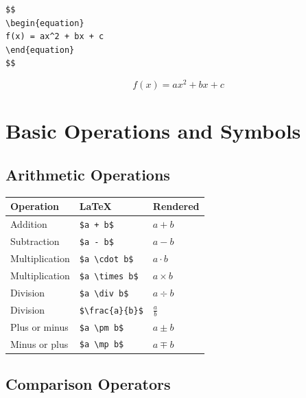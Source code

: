 \documentclass[
  letterpaper,
  DIV=11,
  numbers=noendperiod]{scrartcl}
\begin{document}
\begin{verbatim}
$$
\begin{equation}
f(x) = ax^2 + bx + c
\end{equation}
$$
\end{verbatim}

\[
\begin{equation}
f(x) = ax^2 + bx + c
\end{equation}
\]

\hypertarget{basic-operations-and-symbols}{%
\section{Basic Operations and
Symbols}\label{basic-operations-and-symbols}}

\hypertarget{arithmetic-operations}{%
\subsection{Arithmetic Operations}\label{arithmetic-operations}}

\begin{longtable}[]{@{}lll@{}}
\toprule()
Operation & LaTeX & Rendered \\
\midrule()
\endhead
Addition & \texttt{\$a\ +\ b\$} & \(a + b\) \\
Subtraction & \texttt{\$a\ -\ b\$} & \(a - b\) \\
Multiplication & \texttt{\$a\ \textbackslash{}cdot\ b\$} &
\(a \cdot b\) \\
Multiplication & \texttt{\$a\ \textbackslash{}times\ b\$} &
\(a \times b\) \\
Division & \texttt{\$a\ \textbackslash{}div\ b\$} & \(a \div b\) \\
Division & \texttt{\$\textbackslash{}frac\{a\}\{b\}\$} &
\(\frac{a}{b}\) \\
Plus or minus & \texttt{\$a\ \textbackslash{}pm\ b\$} & \(a \pm b\) \\
Minus or plus & \texttt{\$a\ \textbackslash{}mp\ b\$} & \(a \mp b\) \\
\bottomrule()
\end{longtable}

\hypertarget{comparison-operators}{%
\subsection{Comparison Operators}\label{comparison-operators}}
\end{document}
